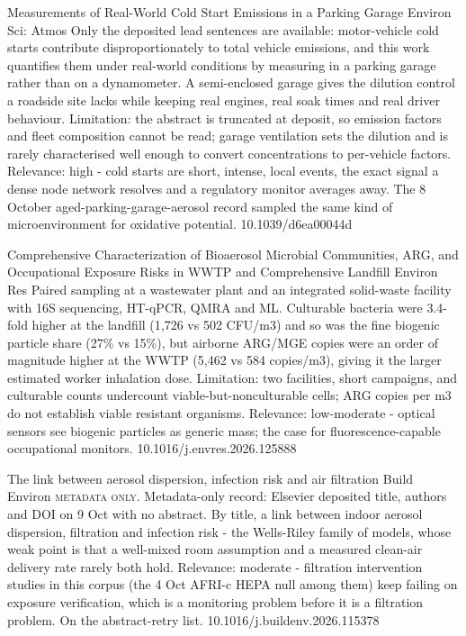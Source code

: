 \documentclass[10pt]{article}
\begin{document}
{Measurements of Real-World Cold Start Emissions in a Parking Garage}
{Environ Sci: Atmos}
{Only the deposited lead sentences are available: motor-vehicle cold starts contribute disproportionately to total vehicle emissions, and this work quantifies them under real-world conditions by measuring in a parking garage rather than on a dynamometer. A semi-enclosed garage gives the dilution control a roadside site lacks while keeping real engines, real soak times and real driver behaviour. Limitation: the abstract is truncated at deposit, so emission factors and fleet composition cannot be read; garage ventilation sets the dilution and is rarely characterised well enough to convert concentrations to per-vehicle factors. Relevance: high - cold starts are short, intense, local events, the exact signal a dense node network resolves and a regulatory monitor averages away. The 8 October aged-parking-garage-aerosol record sampled the same kind of microenvironment for oxidative potential.}
{10.1039/d6ea00044d}

\par{}\baselineskip{}\baselineskip
{}

{Comprehensive Characterization of Bioaerosol Microbial Communities, ARG, and Occupational Exposure Risks in WWTP and Comprehensive Landfill}
{Environ Res}
{Paired sampling at a wastewater plant and an integrated solid-waste facility with 16S sequencing, HT-qPCR, QMRA and ML. Culturable bacteria were 3.4-fold higher at the landfill (1,726 vs 502 CFU/m3) and so was the fine biogenic particle share (27\% vs 15\%), but airborne ARG/MGE copies were an order of magnitude higher at the WWTP (5,462 vs 584 copies/m3), giving it the larger estimated worker inhalation dose. Limitation: two facilities, short campaigns, and culturable counts undercount viable-but-nonculturable cells; ARG copies per m3 do not establish viable resistant organisms. Relevance: low-moderate - optical sensors see biogenic particles as generic mass; the case for fluorescence-capable occupational monitors.}
{10.1016/j.envres.2026.125888}

{The link between aerosol dispersion, infection risk and air filtration}
{Build Environ}
{\textsc{metadata only.} Metadata-only record: Elsevier deposited title, authors and DOI on 9 Oct with no abstract. By title, a link between indoor aerosol dispersion, filtration and infection risk - the Wells-Riley family of models, whose weak point is that a well-mixed room assumption and a measured clean-air delivery rate rarely both hold. Relevance: moderate - filtration intervention studies in this corpus (the 4 Oct AFRI-c HEPA null among them) keep failing on exposure verification, which is a monitoring problem before it is a filtration problem. On the abstract-retry list.}
{10.1016/j.buildenv.2026.115378}
\end{document}
